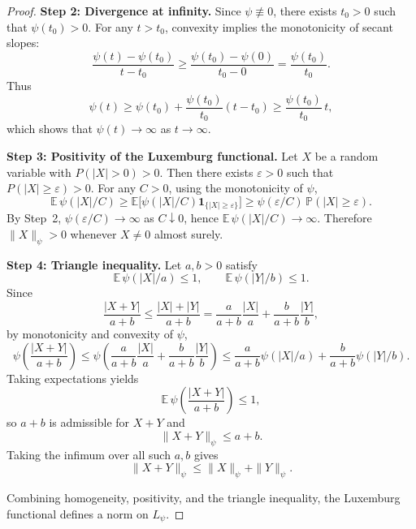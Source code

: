 \documentclass[12pt]{article}
\renewcommand{\(}{\left(}%
\renewcommand{\)}{\right)}%
\renewcommand{\[}{\left[}%
\renewcommand{\]}{\right]}%
\newtheorem{proof}{Proof.}}
\begin{document}
\begin{proof}
\medskip
\textbf{Step 2: Divergence at infinity.}
Since $\psi\not\equiv 0$, there exists $t_0>0$ such that $\psi(t_0)>0$.
For any $t>t_0$, convexity implies the monotonicity of secant slopes:
\begin{equation*}
\frac{\psi(t)-\psi(t_0)}{t-t_0}
\ge
\frac{\psi(t_0)-\psi(0)}{t_0-0}
=
\frac{\psi(t_0)}{t_0}.
\end{equation*}
Thus
\begin{equation*}
\psi(t)
\ge
\psi(t_0)+\frac{\psi(t_0)}{t_0}(t-t_0)
\ge
\frac{\psi(t_0)}{t_0}\,t,
\end{equation*}
which shows that $\psi(t)\to\infty$ as $t\to\infty$.

\medskip
\textbf{Step 3: Positivity of the Luxemburg functional.}
Let $X$ be a random variable with $P(|X|>0)>0$.
Then there exists $\varepsilon>0$ such that $P(|X|\ge\varepsilon)>0$.
For any $C>0$, using the monotonicity of $\psi$,
\begin{equation*}
\mathbb E\,\psi(|X|/C)
\ge
\mathbb E\big[\psi(|X|/C)\mathbf 1_{\{|X|\ge\varepsilon\}}\big]
\ge
\psi(\varepsilon/C)\,\mathbb P(|X|\ge\varepsilon).
\end{equation*}
By Step~2, $\psi(\varepsilon/C)\to\infty$ as $C\downarrow 0$, hence
$\mathbb E\,\psi(|X|/C)\to\infty$.
Therefore $\|X\|_\psi>0$ whenever $X\neq 0$ almost surely.

\medskip
\textbf{Step 4: Triangle inequality.}
Let $a,b>0$ satisfy
\begin{equation*}
\mathbb E\,\psi(|X|/a)\le 1,
\qquad
\mathbb E\,\psi(|Y|/b)\le 1.
\end{equation*}
Since 
\begin{equation*}
	\frac{|X+Y|}{a+b}\leq \frac{|X|+|Y|}{a+b}=\frac{a}{a+b}\frac{|X|}{a}
+
\frac{b}{a+b}\frac{|Y|}{b},
\end{equation*}
by monotonicity and convexity of $\psi$,
\begin{equation*}
\psi\!\left(
\frac{|X+Y|}{a+b}
\right)
\le
\psi\!\left(
\frac{a}{a+b}\frac{|X|}{a}
+
\frac{b}{a+b}\frac{|Y|}{b}
\right)
\le
\frac{a}{a+b}\psi(|X|/a)
+
\frac{b}{a+b}\psi(|Y|/b).
\end{equation*}
Taking expectations yields
\begin{equation*}
\mathbb E\,\psi\!\left(\frac{|X+Y|}{a+b}\right)\le 1,
\end{equation*}
so $a+b$ is admissible for $X+Y$ and
\begin{equation*}
\|X+Y\|_\psi \le a+b.
\end{equation*}
Taking the infimum over all such $a,b$ gives
\begin{equation*}
\|X+Y\|_\psi \le \|X\|_\psi + \|Y\|_\psi.
\end{equation*}

\medskip
Combining homogeneity, positivity, and the triangle inequality, the Luxemburg functional defines a norm on $L_\psi$.
\end{proof}
\end{document}
